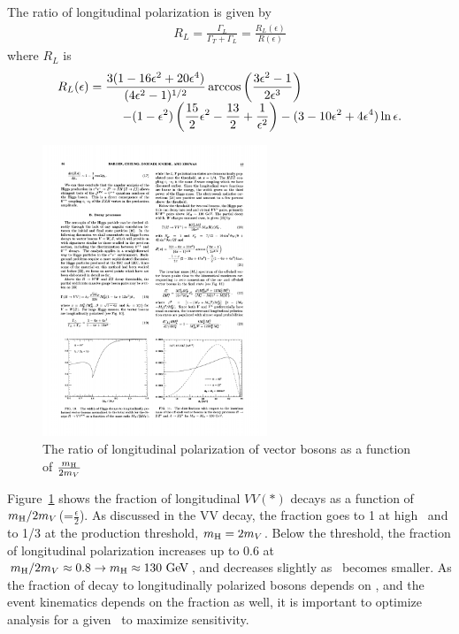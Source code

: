 The ratio of longitudinal polarization is given \cite{PhysRevD.49.79} by 
\begin{eqnarray} 
R_L 
=
\frac{\Gamma_L}{\Gamma_T + \Gamma_L}    
= 
\frac{R_L(\epsilon)}{R(\epsilon)}  
\end{eqnarray} 
where $R_L$ is \cite{PhysRevD.49.79} 
\begin{eqnarray} 
\begin{array}{ccc} \multicolumn{2}{c}{\displaystyle 
R_L(\epsilon) = \frac{3(1-16\epsilon^2+20\epsilon^4)}{(4\epsilon^2-1)^{1/2}} 
                \arccos \left( \frac{3\epsilon^2-1}{2\epsilon^3} \right)  
} & \\ & \multicolumn{2}{c}{\hspace{1.5cm} \displaystyle
- (1-\epsilon^2)\left( \frac{15}{2}\epsilon^2 - \frac{13}{2} + \frac{1}{\epsilon^2} \right)  
- (3-10\epsilon^2+4\epsilon^4) \ln \epsilon.
} \end{array}      
\end{eqnarray} 
%
\begin{figure}[t]
\centering
\includegraphics[width=0.6\textwidth]{figures/HVV_polarization_ratio.pdf}
\caption{The ratio of longitudinal polarization of vector bosons 
as a function of $\frac{m_{\mathrm{H}}}{2m_V}$ \cite{PhysRevD.49.79} }
\label{fig:HVV_polarization_ratio}
\end{figure}
Figure~\ref{fig:HVV_polarization_ratio} shows the fraction of longitudinal $VV(*)$ decays 
as a function of $m_{\mathrm{H}}/2m_V$(=$\displaystyle \frac{\epsilon}{2}$). 
As discussed in the VV decay, the fraction goes to 1 at high \mHi\ and 
to 1/3 at the production threshold, $m_{\mathrm{H}} = 2m_V$.
Below the threshold, the fraction of longitudinal polarization 
increases up to 0.6 at $m_{\mathrm{H}}/2m_V \approx 0.8 \rightarrow m_{\mathrm{H}} \approx 130~\mathrm{Ge\kern -0.1em V}$,
and decreases slightly as \mHi\ becomes smaller. 
As the fraction of decay to longitudinally polarized bosons depends on \mHi, 
and the event kinematics depends on the fraction as well, 
it is important to optimize analysis for a given \mHi\ to maximize sensitivity. 
\\ 

